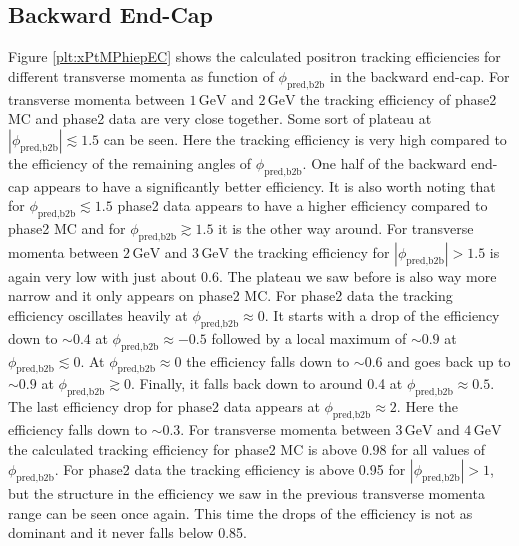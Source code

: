\documentclass[a4paper,11pt,twosided,final,german,openbib,pdftex,listof=totoc,bibliography=totoc]{scrbook}
\begin{document}
\newpage

\subsection{Backward End-Cap}

Figure \ref{plt:xPtMPhiepEC} shows the calculated positron tracking efficiencies for different transverse momenta as function of $\phi_{\textrm{pred,b2b}}$ in the backward end-cap. 
For transverse momenta between $1\,\textrm{GeV}$ and $2\,\textrm{GeV}$ the tracking efficiency of phase2 MC and phase2 data are very close together. Some sort of plateau at $|\phi_{\textrm{pred,b2b}}| \lesssim 1.5$ can be seen. Here the tracking efficiency is very high compared to the efficiency of the remaining angles of $\phi_{\textrm{pred,b2b}}$. One half of the backward end-cap appears to have a significantly better efficiency. It is also worth noting that for $\phi_{\textrm{pred,b2b}} \lesssim 1.5$ phase2 data appears to have a higher efficiency compared to phase2 MC and for $\phi_{\textrm{pred,b2b}} \gtrsim 1.5$ it is the other way around. 
For transverse momenta between $2\,\textrm{GeV}$ and $3\,\textrm{GeV}$ the tracking efficiency for $|\phi_{\textrm{pred,b2b}}| >1.5$ is again very low with just about 0.6. The plateau we saw before is also way more narrow and it only appears on phase2 MC. For phase2 data the tracking efficiency oscillates heavily at $\phi_{\textrm{pred,b2b}} \approx 0$. It starts with a drop of the efficiency down to $\sim 0.4$ at $\phi_{\textrm{pred,b2b}} \approx -0.5$ followed by a local maximum of $\sim 0.9$ at $\phi_{\textrm{pred,b2b}} \lesssim 0$. At $\phi_{\textrm{pred,b2b}} \approx 0 $ the efficiency falls down to $\sim 0.6$ and goes back up to $\sim 0.9$ at $\phi_{\textrm{pred,b2b}} \gtrsim 0$. Finally, it falls back down to around 0.4 at $\phi_{\textrm{pred,b2b}} \approx 0.5$. The last efficiency drop for phase2 data appears at $\phi_{\textrm{pred,b2b}} \approx 2$. Here the efficiency falls down to $\sim 0.3$. 
For transverse momenta between $3\,\textrm{GeV}$ and $4\,\textrm{GeV}$ the calculated tracking efficiency for phase2 MC is above 0.98 for all values of $\phi_{\textrm{pred,b2b}}$. For phase2 data the tracking efficiency is above 0.95 for $|\phi_{\textrm{pred,b2b}}| > 1$, but the structure in the efficiency we saw in the previous transverse momenta range can be seen once again. This time the drops of the efficiency is not as dominant and it never falls below 0.85.
\end{document}
